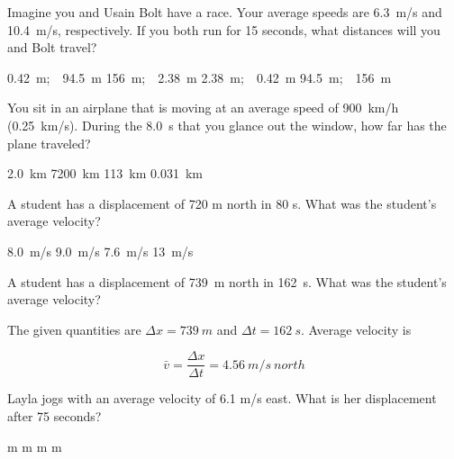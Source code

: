 \documentclass[]{exam}
\begin{document}
\begin{questions}
\begin{questions}
\question
Imagine you and Usain Bolt have a race. Your average speeds are \SI{6.3}{m/s} and \SI{10.4}{m/s}, respectively. If you both run for 15 seconds, what distances will you and Bolt travel?

\begin{choices}
    \choice  \SI{0.42}{m};\ \ \SI{94.5}{m}
    \choice  \SI{156}{m};\ \ \SI{2.38}{m}
    \choice  \SI{2.38}{m};\ \ \SI{0.42}{m}
    \correctchoice \SI{94.5}{m};\ \ \SI{156}{m} 
\end{choices}

\question %
You sit in an airplane that is moving at an average speed of 
\SI{900}{km/h} (\SI{0.25}{km/s}). During the \SI{8.0}{s}
that you glance out the window, how far has the plane traveled?

\begin{choices}
\CorrectChoice \SI{2.0}{km}
\choice \SI{7200}{km}
\choice \SI{113}{km}
\choice \SI{0.031}{km}
\end{choices}


\clearpage

\question %
A student has a displacement of 720 m north in 80 s. What was the student's average velocity?

\begin{choices}
\choice \SI{8.0}{m/s}
\CorrectChoice \SI{9.0}{m/s}
\choice \SI{7.6}{m/s}
\choice \SI{13}{m/s}
\end{choices}


\question
A student has a displacement of \SI{739}{m} north in \SI{162}{s}. What was the student's average velocity?

\begin{solution}
    The given quantities are $\Delta{x} = \SI{739}{m}$ and $\Delta{t} = \SI{162}{s}$. Average velocity is

\begin{equation*}
        \bar{v} = \frac{\Delta{x}}{\Delta{t}} = \SI{4.56}{m/s\ north}
\end{equation*}
\end{solution}



\question %
Layla jogs with an average velocity of 6.1 m/s east. What is her displacement after 75 seconds?

\begin{choices}
 m
 m
 m
 m
\end{choices}



\end{questions}
\end{questions}
\end{document}
